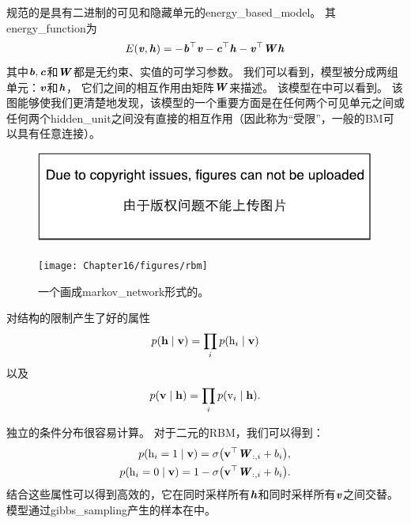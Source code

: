 规范的是具有二进制的可见和隐藏单元的\gls{energy_based_model}。 其\gls{energy_function}为
\begin{align}
\label{eqn:1610}
E(\boldsymbol{\mathit{v}},\boldsymbol{\mathit{h}}) = -\boldsymbol{\mathit{b}}^{\top}\boldsymbol{\mathit{v}} - \boldsymbol{\mathit{c}}^{\top}\boldsymbol{\mathit{h}} - \boldsymbol{\mathit{v}}^{\top}\boldsymbol{\mathit{W}}\boldsymbol{\mathit{h}}
\end{align}
其中$\boldsymbol{\mathit{b}},\boldsymbol{\mathit{c}}$和$\boldsymbol{\mathit{W}}$都是无约束、实值的可学习参数。
我们可以看到，模型被分成两组单元：$\boldsymbol{\mathit{v}}$和$\boldsymbol{\mathit{h}}$，
它们之间的相互作用由矩阵$\boldsymbol{\mathit{W}}$来描述。
该模型在中可以看到。
该图能够使我们更清楚地发现，该模型的一个重要方面是在任何两个可见单元之间或任何两个\gls{hidden_unit}之间没有直接的相互作用（因此称为``受限''，一般的\gls{BM}可以具有任意连接）。



\begin{figure}[!htb]
\ifOpenSource
\centerline{\includegraphics{figure.pdf}}
\else
	\centerline{\texttt{[image: Chapter16/figures/rbm]}}	
\fi
	\caption{一个画成\gls{markov_network}形式的。}
	\label{fig:rbm}
\end{figure}



对结构的限制产生了好的属性
\begin{align}
\label{eqn:1611}
p(\mathbf{h}\mid\mathbf{v}) = \prod_i p(\mathrm{h}_i\mid \mathbf{v})
\end{align}
以及
\begin{align}
\label{eqn:1612}
p(\mathbf{v}\mid\mathbf{h}) = \prod_i p(\mathrm{v}_i\mid \mathbf{h}).
\end{align}


独立的条件分布很容易计算。
对于二元的\gls{RBM}，我们可以得到：
\begin{align}
\label{eqn:1613}
\begin{aligned}
p(\mathrm{h}_i = 1\mid\mathbf{v}) = \sigma\big(\mathbf{v}^{\top}\boldsymbol{\mathit{W}}_{:,i} + b_i\big),\\
p(\mathrm{h}_i = 0\mid\mathbf{v}) = 1 - \sigma\big(\mathbf{v}^{\top}\boldsymbol{\mathit{W}}_{:,i} + b_i\big).\\
\end{aligned}
\end{align}
结合这些属性可以得到高效的，它在同时采样所有$\boldsymbol{\mathit{h}}$和同时采样所有$\boldsymbol{\mathit{v}}$之间交替。
模型通过\gls{gibbs_sampling}产生的样本在中。

